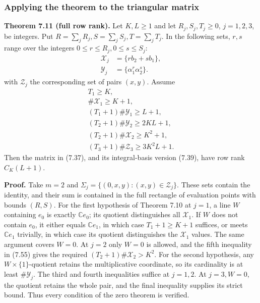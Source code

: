 \documentclass[
  11pt,
  a4paper,
]{article}
\begin{document}
\subsubsection{Applying the theorem to the triangular
matrix}\label{applying-the-theorem-to-the-triangular-matrix}

\textbf{Theorem 7.11 (full row rank).} Let \(K,L\ge1\) and let
\(R_j,S_j,T_j\ge0\), \(j=1,2,3\), be integers. Put
\(R=\sum_jR_j,S=\sum_jS_j,T=\sum_jT_j\). In the following sets, \(r,s\)
range over the integers \(0\le r\le R_j,0\le s\le S_j\): \[
\begin{aligned}
\mathcal X_j&=\{rb_2+sb_1\},\\
\mathcal Y_j&=\{\alpha_1^r\alpha_2^s\}.
\end{aligned}
\] with \(\mathcal Z_j\) the corresponding set of pairs \((x,y)\).
Assume \[
\begin{gathered}
T_1\ge K,\\
\#\mathcal X_1\ge K+1,\\
(T_1+1)\#\mathcal Y_1\ge L+1,\\
(T_2+1)\#\mathcal Y_2\ge2KL+1,\\
(T_2+1)\#\mathcal X_2\ge K^2+1,\\
(T_3+1)\#\mathcal Z_3\ge3K^2L+1.
\end{gathered} \tag{7.55}
\] Then the matrix in (7.37), and its integral-basis version (7.39),
have row rank \(C_K(L+1)\).

\textbf{Proof.} Take \(m=2\) and
\(\Sigma_j=\{(0,x,y):(x,y)\in\mathcal Z_j\}\). These sets contain the
identity, and their sum is contained in the full rectangle of evaluation
points with bounds \((R,S)\). For the first hypothesis of Theorem 7.10
at \(j=1\), a line \(W\) containing \(e_0\) is exactly
\(\mathbb C e_0\); its quotient distinguishes all \(\mathcal X_1\). If
\(W\) does not contain \(e_0\), it either equals \(\mathbb C e_1\), in
which case \(T_1+1\ge K+1\) suffices, or meets \(\mathbb C e_1\)
trivially, in which case its quotient distinguishes the \(\mathcal X_1\)
values. The same argument covers \(W=0\). At \(j=2\) only \(W=0\) is
allowed, and the fifth inequality in (7.55) gives the required
\((T_2+1)\#\mathcal X_2>K^2\). For the second hypothesis, any
\(W\times\{1\}\)-quotient retains the multiplicative coordinate, so its
cardinality is at least \(\#\mathcal Y_j\). The third and fourth
inequalities suffice at \(j=1,2\). At \(j=3,W=0\), the quotient retains
the whole pair, and the final inequality supplies its strict bound. Thus
every condition of the zero theorem is verified.
\end{document}
